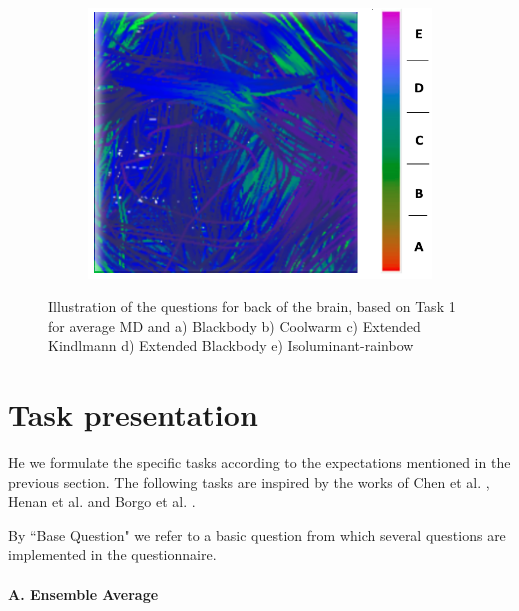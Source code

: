 \documentclass[hyperref, plainreport, noproblem]{cgvpub1}
\begin{document}
\begin{figure}[ht]
\begin{subfigure}[b]{0.45\textwidth}
    	\includegraphics[width =  \columnwidth]{isorainbow-md}
	\caption{ }
    \end{subfigure}	
    \caption{Illustration of the questions for back of the brain, based on Task 1 for average MD and a) Blackbody b) Coolwarm c) Extended Kindlmann d) Extended Blackbody e) Isoluminant-rainbow }
    \label{fig:task1-md}
\end{figure}

\section{Task presentation}
He we formulate the specific tasks according to the expectations mentioned in the previous section. The following tasks are inspired by the works of Chen et al. \cite{chen}, Henan et al. \cite{henan} and Borgo et al. \cite{borgo}.

By ``Base Question" we refer to a basic question from which several questions are implemented in the questionnaire.

\paragraph{A. Ensemble Average}
\end{document}
